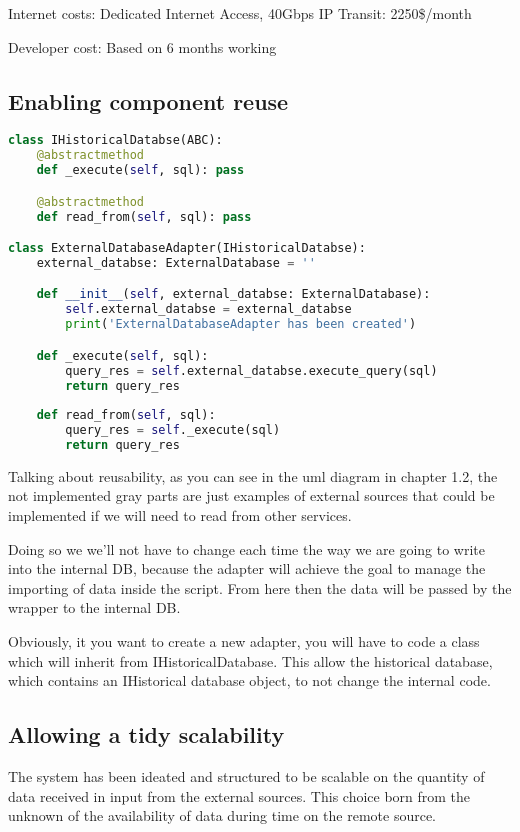 Internet costs:  Dedicated Internet Access, 40Gbps IP Transit: 2250\$/month

Developer cost:  Based on 6 months working\\

\subsection{Enabling component reuse}

\begin{lstlisting}[language=Python]
class IHistoricalDatabse(ABC):
    @abstractmethod
    def _execute(self, sql): pass

    @abstractmethod
    def read_from(self, sql): pass

class ExternalDatabaseAdapter(IHistoricalDatabse):
    external_databse: ExternalDatabase = ''

    def __init__(self, external_databse: ExternalDatabase):
        self.external_databse = external_databse
        print('ExternalDatabaseAdapter has been created')

    def _execute(self, sql):
        query_res = self.external_databse.execute_query(sql)
        return query_res
    
    def read_from(self, sql):
        query_res = self._execute(sql) 
        return query_res   
\end{lstlisting}

Talking about reusability, as you can see in the uml diagram in chapter 1.2, the not implemented gray parts are just examples of external sources that could be implemented if we will need to read from other services. 

Doing so we we'll not have to change each time the way we are going to write into the internal DB, because the adapter will achieve the goal to manage the importing of data inside the script. From here then the data will be passed by the wrapper to the internal DB.

Obviously, it you want to create a new adapter, you will have to code a class which will inherit from IHistoricalDatabase. This allow the historical database, which contains an IHistorical database object, to not change the internal code.

\subsection{Allowing a tidy scalability}

The system has been ideated and structured to be scalable on the quantity of data received in input from the external sources.
This choice born from the unknown of the availability of data during time on the remote source.

